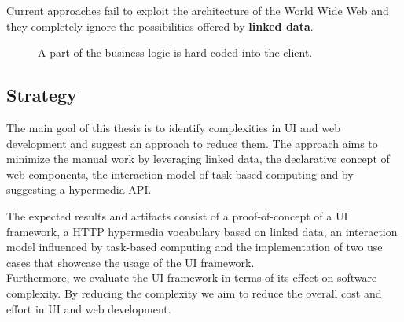 Current approaches fail to exploit the architecture of the World Wide Web and they completely ignore the possibilities offered by \textbf{linked data}.

\begin{figure}[!htb]
  \caption{\label{fig:my-label} A part of the business logic is hard coded into the client.}
\end{figure}

\subsection{Strategy}\label{strategy}
The main goal of this thesis is to identify complexities in UI and web development and suggest an approach to reduce them.
The approach aims to minimize the manual work by leveraging linked data, the declarative concept of web components, the interaction model of task-based computing and by suggesting a hypermedia API.

The expected results and artifacts consist of a proof-of-concept of a UI framework, a HTTP hypermedia vocabulary based on linked data, an interaction model influenced by task-based computing and the implementation of two use cases that showcase the usage of the UI framework. \\
Furthermore, we evaluate the UI framework in terms of its effect on software complexity. By reducing the complexity we aim to reduce the overall cost and effort in UI and web development.
